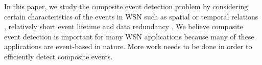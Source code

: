 In this paper, we study the composite event detection problem by considering certain characteristics of the events in WSN such as spatial or temporal relations \cite{li:tracking},  relatively short event lifetime and data redundancy \cite{bogdan:redundancy}. We believe composite event detection is important for many WSN applications because many of these applications are event-based in nature. More work needs to be done in order to efficiently detect composite events.  
